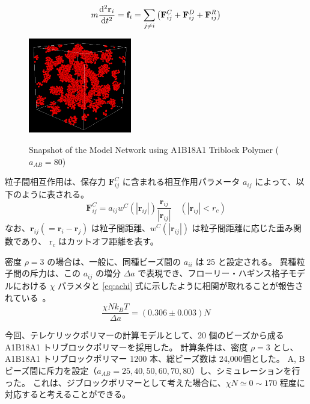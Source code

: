\documentclass[11pt]{jsarticle}
\begin{document}
\begin{equation}
m\dfrac{{\rm d}^2 {\bf r}_i}{{\rm d} t^2} = {\bf f}_i = \sum_{j \neq i} \left( {\bf F}_{ij}^C + {\bf F}_{ij}^D + {\bf F}_{ij}^R \right)
\end{equation}


\begin{figure}
\vspace{-1\baselineskip}
	\begin{center}
	\includegraphics[width=45mm]{./fig/Snap.png}
	\label{fig: snap}
	\caption{Snapshot of the Model Network using A1B18A1 Triblock Polymer ($a_{AB} = 80$)}
	\end{center}
\end{figure}

粒子間相互作用は、保存力 $\mathbf{F}_{ij}^C$ に含まれる相互作用パラメータ $a_{ij}$ によって、以下のように表される。
\begin{equation}
\mathbf{F}_{ij}^C =
        	a_{ij} w^C (|\mathbf{r}_{ij}|) \dfrac{\mathbf{r}_{ij}}{|\mathbf{r}_{ij}|} \quad (|\mathbf{r}_{ij}| < r_c)
\end{equation}
なお、$\mathbf{r}_{ij} (=\mathbf{r}_i - \mathbf{r}_j)$ は粒子間距離、$w^C (|\mathbf{r}_{ij}|)$ は粒子間距離に応じた重み関数であり、 r$_c$ はカットオフ距離を表す。

密度 $\rho =3$ の場合は、一般に、同種ビーズ間の $a_{ii}$ は 25 と設定される。
異種粒子間の斥力は、この $a_{ij}$ の増分 $\Delta a$ で表現でき、フローリー・ハギンス格子モデルにおける $\chi$ パラメタと \eqref{eq:achi} 式に示したように相関が取れることが報告されている~\cite{Groot1997}。
\begin{equation}
\dfrac{\chi N k_B T}{\Delta a} = (0.306 \pm 0.003) N
\label{eq:achi}
\end{equation}



今回、テレケリックポリマーの計算モデルとして、20 個のビーズから成る A1B18A1 トリブロックポリマーを採用した。
計算条件は、密度 $\rho =3$ とし、A1B18A1 トリブロックポリマー 1200 本、総ビーズ数は 24,000個とした。
A, B ビーズ間に斥力を設定（$a_{AB} = 25, 40, 50, 60, 70, 80$）し、シミュレーションを行った。
これは、ジブロックポリマーとして考えた場合に、$\chi N \simeq 0 \sim 170$ 程度に対応すると考えることができる。
\end{document}
